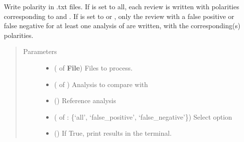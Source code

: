 \documentclass[letterpaper,10pt,english]{sphinxmanual}
\begin{document}
\begin{fulllineitems}
\label{\detokenize{analysis:loacore.analysis.polarity_check.write_polarity_check}}
Write polarity in .txt files. If  is set to all, each review is written with polarities corresponding to
 and . If  is set to  or , only the review with a
false positive or false negative for at least one analysis of  are written, with the
corresponding(s) polarities.
\begin{quote}\begin{description}
\item[{Parameters}] \leavevmode\begin{itemize}
\item {} 
 ( of {\color{red}\bfseries{}\textbar{}File\textbar{}}) \textendash{} Files to process.

\item {} 
 ( of ) \textendash{} Analysis to compare with 

\item {} 
 () \textendash{} Reference analysis

\item {} 
 ( of  : \{‘all’, ‘false\_positive’, ‘false\_negative’\}) \textendash{} Select option

\item {} 
 () \textendash{} If True, print results in the terminal.


\end{itemize}
\end{description}
\end{quote}
\end{fulllineitems}
\end{document}
